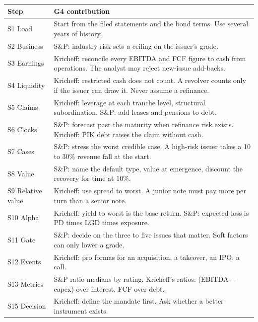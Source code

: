 {\footnotesize
\begin{tabularx}{\linewidth}{@{}>{\raggedright\arraybackslash}p{24mm}>{\raggedright\arraybackslash}X@{}}
\toprule
Step & G4 contribution \\
\midrule
S1 Load & Start from the filed statements and the bond terms. Use several years of history. \\
S2 Business & S\&P: industry risk sets a ceiling on the issuer's grade. \\
S3 Earnings & Kricheff: reconcile every EBITDA and FCF figure to cash from operations. The analyst may reject new-issue add-backs. \\
S4 Liquidity & Kricheff: restricted cash does not count. A revolver counts only if the issuer can draw it. Never assume a refinance. \\
S5 Claims & Kricheff: leverage at each tranche level, structural subordination. S\&P: add leases and pensions to debt. \\
S6 Clocks & S\&P: forecast past the maturity when refinance risk exists. Kricheff: PIK debt raises the claim without cash. \\
S7 Cases & S\&P: stress the worst credible case. A high-risk issuer takes a 10 to 30\% revenue fall at the start. \\
S8 Value & S\&P: name the default type, value at emergence, discount the recovery for time at 10\%. \\
S9 Relative value & Kricheff: use spread to worst. A junior note must pay more per turn than a senior note. \\
S10 Alpha & Kricheff: yield to worst is the base return. S\&P: expected loss is PD times LGD times exposure. \\
S11 Gate & S\&P: decide on the three to five issues that matter. Soft factors can only lower a grade. \\
S12 Events & Kricheff: pro formas for an acquisition, a takeover, an IPO, a call. \\
S13 Metrics & S\&P ratio medians by rating. Kricheff's ratios: (EBITDA $-$ capex) over interest, FCF over debt. \\
S15 Decision & Kricheff: define the mandate first. Ask whether a better instrument exists. \\
\bottomrule
\end{tabularx}
}

